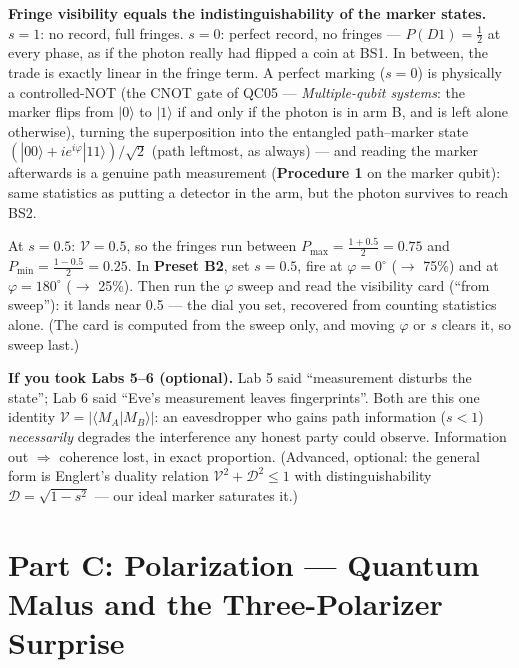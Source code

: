 \documentclass[a4paper,11pt]{article}
\providecommand{\ket}[1]{|#1\rangle}
\providecommand{\braket}[2]{\langle#1|#2\rangle}
\begin{document}
\textbf{Fringe visibility equals the indistinguishability of the marker states.}
$s = 1$: no record, full fringes. $s = 0$: perfect record, no fringes ---
$P(D1) = \tfrac12$ at every phase, as if the photon really had flipped a coin at BS1.
In between, the trade is exactly linear in the fringe term. A perfect marking
($s = 0$) is physically a controlled-NOT (the CNOT gate of QC05 ---
\textit{Multiple-qubit systems}: the marker flips from $\ket{0}$ to $\ket{1}$ if and
only if the photon is in arm B, and is left alone otherwise), turning
the superposition into the entangled path--marker state
$(\ket{00} + i e^{i\varphi}\ket{11})/\sqrt 2$ (path leftmost, as always) --- and
reading the marker afterwards is a genuine path measurement
(\textbf{Procedure 1} on the marker qubit): same statistics as putting a detector in
the arm, but the photon survives to reach BS2.

\begin{numberbox}
At $s = 0.5$: $\mathcal{V} = 0.5$, so the fringes run between
$P_{\max} = \tfrac{1+0.5}{2} = \mathbf{0.75}$ and
$P_{\min} = \tfrac{1-0.5}{2} = \mathbf{0.25}$. In \textbf{Preset B2}, set $s = 0.5$,
fire at $\varphi = 0^\circ$ ($\rightarrow$ 75\%) and at $\varphi = 180^\circ$
($\rightarrow$ 25\%). Then run the $\varphi$ sweep and read the visibility card
(``from sweep''): it lands near 0.5 --- the dial you set, recovered from counting
statistics alone. (The card is computed from the sweep only, and moving $\varphi$ or
$s$ clears it, so sweep last.)
\end{numberbox}

\begin{connectionbox}
\textbf{If you took Labs 5--6 (optional).}
Lab 5 said ``measurement disturbs the state''; Lab 6 said ``Eve's measurement leaves
fingerprints''. Both are this one identity $\mathcal{V} = |\braket{M_A}{M_B}|$: an
eavesdropper who gains path information ($s < 1$) \emph{necessarily} degrades the
interference any honest party could observe. Information out $\Longrightarrow$
coherence lost, in exact proportion. (Advanced, optional: the general form is
Englert's duality relation
$\mathcal{V}^2 + \mathcal{D}^2 \leq 1$ with distinguishability
$\mathcal{D} = \sqrt{1 - s^2}$ --- our ideal marker saturates it.)
\end{connectionbox}

\section{Part C: Polarization --- Quantum Malus and the Three-Polarizer Surprise}
\end{document}
